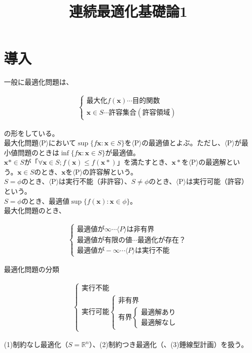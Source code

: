 \documentclass[a4j]{jarticle}
\date{}
\title{連続最適化基礎論1}
\begin{document}
\maketitle

\section{導入}
一般に最適化問題は、

\begin{eqnarray*}
  \begin{cases}最大化f(\bm{x})\cdots 目的関数\\\bm{x}\in S\cdots 許容集合(許容領域)\end{cases}
\end{eqnarray*}

の形をしている。\\

最大化問題$\langle$P$\rangle$において$\sup\{ f{\bm{x}:\bm{x}\in S}\}$を$\langle$P$\rangle$の最適値とよぶ。ただし、$\langle$P$\rangle$が最小値問題のときは$\inf\{ f{\bm{x}:\bm{x}\in S}\}$が最適値。\\

$\bm{x}\ast\in S$が「$\forall\bm{x}\in S; f(\bm{x})\le f(\bm{x}\ast)$」を満たすとき、$\bm{x}\ast$を$\langle$P$\rangle$の最適解という。$\bm{x}\in S$のとき、$\bm{x}$を$\langle$P$\rangle$の許容解という。\\

$S=\phi$のとき、$\langle$P$\rangle$は実行不能（非許容）、$S\neq\phi$のとき、$\langle$P$\rangle$は実行可能（許容）という。\\

$S=\phi$のとき、最適値$\sup\{f(\bm{x}):\bm{x}\in\phi\}$。\\

最大化問題のとき、

\begin{eqnarray*}
  \begin{cases}最適値が\infty\cdots\langle P\rangle は非有界\\最適値が有限の値\cdots 最適化が存在？\\最適値が-\infty\cdots\langle P\rangle は実行不能\end{cases}
\end{eqnarray*}

最適化問題の分類

\begin{eqnarray*}
  \begin{cases}実行不能\\実行可能\begin{cases}非有界\\有界\begin{cases}最適解あり\\最適解なし\end{cases}\end{cases}\end{cases}
\end{eqnarray*}

(1)制約なし最適化（$S=\mathbb{R}^{n}$）、(2)制約つき最適化（、(3)錘線型計画）を扱う。
\end{document}
